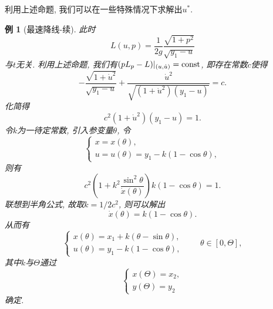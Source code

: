 \documentclass[12pt,a4paper]{article}
\newtheorem{example}[theorem]{例}
\begin{document}
利用上述命题, 我们可以在一些特殊情况下求解出$u^*$.

\begin{example}[最速降线-续]
    此时
    \begin{equation*}
        L(u, p) = \frac{1}{2g}\frac{\sqrt{1 + p^2}}{\sqrt{y_1 - u}}
    \end{equation*}
    与$t$无关. 利用上述命题, 我们有$(pL_p - L)|_{(u, \dot{u})} = {\rm const}$, 即存在常数$c$使得 
    \begin{equation*}
        -\frac{\sqrt{1 + \dot{u}^2}}{\sqrt{y_1 - u}} + \frac{\dot{u}^2}{\sqrt{(1 + \dot{u}^2)(y_1 - u)}} = c.
    \end{equation*}
    化简得 
    \begin{equation*}
        c^2(1 + \dot{u}^2)(y_1 - u) = 1.
    \end{equation*}
    令$k$为一待定常数, 引入参变量$\theta$, 令 
    \begin{equation*}
        \begin{cases} 
            x = x(\theta), \\  
            u = u(\theta) = y_1 - k(1 - \cos\theta), \end{cases}
    \end{equation*}
    则有 
    \begin{equation*}
        c^2\left(1 + k^2\frac{\sin^2\theta}{\dot{x}(\theta)}\right)k(1 - \cos\theta) = 1.
    \end{equation*}
    联想到半角公式, 故取$k = 1/2c^2$, 则可以解出 
    \begin{equation*}
        \dot{x}(\theta) = k(1 - \cos\theta).
    \end{equation*} 
    从而有
    \begin{equation*}
        \begin{cases} 
            x(\theta) = x_1 + k(\theta - \sin\theta), \\ 
            u(\theta) = y_1 - k(1 - \cos\theta), 
        \end{cases} \qquad \theta \in [0, \Theta],
    \end{equation*}
    其中$k$与$\Theta$通过
    \begin{equation*}
        \begin{cases} 
            x(\Theta) = x_2, \\  
            y(\Theta) = y_2 
        \end{cases}
    \end{equation*}
    确定.
\end{example}
\end{document}
